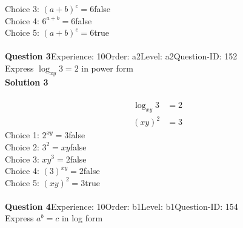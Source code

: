 \documentclass{article}
\begin{document}
Choice 3: \hspace{20pt}$(a+b)^c=6$\hspace{20pt}false\\
Choice 4: \hspace{20pt}$6^{a+b}=6$\hspace{20pt}false\\
Choice 5: \hspace{20pt}$(a+b)^c=6$\hspace{20pt}true\\
\\[4pt]
\noindent\textbf{Question 3}\hspace{20pt}Experience: 10\hspace{20pt}Order: a2\hspace{20pt}Level: a2\hspace{20pt}Question-ID: 152\\[2pt]
Express $\log_{xy}3=2$ in power form\\[4pt]
\noindent\textbf{Solution 3}\\[2pt]
\\[-35pt]\begin{align*}
\log_{xy}3&=2\\[2pt]
(xy)^2&=3
\end{align*}
Choice 1: \hspace{20pt}$2^{xy}=3$\hspace{20pt}false\\
Choice 2: \hspace{20pt}$3^2=xy$\hspace{20pt}false\\
Choice 3: \hspace{20pt}$xy^{3}=2$\hspace{20pt}false\\
Choice 4: \hspace{20pt}$(3)^{xy}=2$\hspace{20pt}false\\
Choice 5: \hspace{20pt}$(xy)^2=3$\hspace{20pt}true\\
\\[4pt]
\noindent\textbf{Question 4}\hspace{20pt}Experience: 10\hspace{20pt}Order: b1\hspace{20pt}Level: b1\hspace{20pt}Question-ID: 154\\[2pt]
Express $a^b=c$ in log form\\[4pt]
\end{document}
